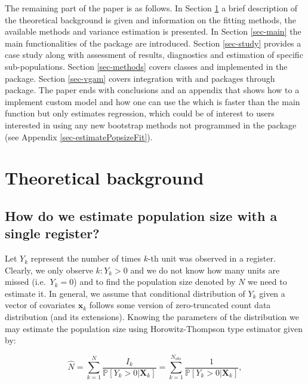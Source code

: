 \documentclass[
]{jss}
\newcommand{\1}{\mathcal{I}} \newcommand{\bZero}{\boldsymbol{0}}
\begin{document}
The remaining part of the paper is as follows. In Section
\ref{sec-theory} a brief description of the theoretical background is
given and information on the fitting methods, the available methods and
variance estimation is presented. In Section \ref{sec-main} the main
functionalities of the package are introduced. Section \ref{sec-study}
provides a case study along with assessment of results, diagnostics and
estimation of specific sub-populations. Section \ref{sec-methods} covers
classes and  implemented in the package. Section
\ref{sec-vgam} covers integration with  and 
packages through  package. The paper ends with
conclusions and an appendix that shows how to a implement custom model
and how one can use the  which is faster than
the main function but only estimates regression, which could be of
interest to users interested in using any new bootstrap methods not
programmed in the package (see Appendix \ref{sec-estimatePopsizeFit}).

\section{Theoretical background}\label{sec-theory}

\subsection{How do we estimate population size with a single
register?}\label{how-do-we-estimate-population-size-with-a-single-register}

Let \(Y_{k}\) represent the number of times \(k\)-th unit was observed
in a register. Clearly, we only observe \(k:Y_{k}>0\) and we do not know
how many units are missed (i.e.~\(Y_{k}=0\)) and to find the population
size denoted by \(N\) we need to estimate it. In general, we assume that
conditional distribution of \(Y_{k}\) given a vector of covariates
\(\boldsymbol{x}_{k}\) follows some version of zero-truncated count data
distribution (and its extensions). Knowing the parameters of the
distribution we may estimate the population size using Horowitz-Thompson
type estimator given by:

\begin{equation}
\hat{N}=
\sum_{k=1}^{N}\frac{I_{k}}{\mathbb{P}[Y_{k}>0|\boldsymbol{X}_{k}]}=
\sum_{k=1}^{N_{obs}}\frac{1}{\mathbb{P}[Y_{k}>0|\boldsymbol{X}_{k}]},
\label{eq-ht-estimator}
\end{equation}
\end{document}
